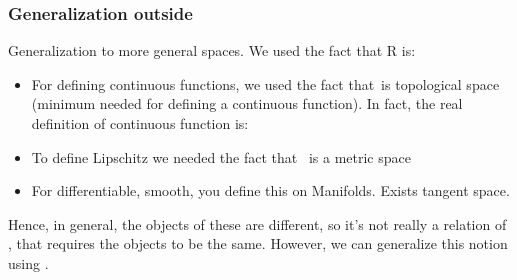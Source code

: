 {{    

    \subsubsection{Generalization outside \reals}
    Generalization to more general spaces.
    We used the fact that R is:
    \begin{itemize}
        \item For defining continuous functions, we used the fact that~\reals is topological space (minimum needed for defining a continuous function).
              In fact, the real definition of continuous function is:


        \item To define Lipschitz we needed the fact that~ \reals is a metric space
        \item For differentiable, smooth, you define this on Manifolds.
              Exists tangent space.
    \end{itemize}

    Hence, in general, the objects of these are different, so it's not really a relation of , that requires the objects to be the same.
    However, we can generalize this notion using .

}

}
